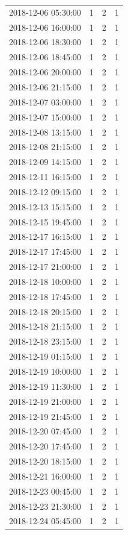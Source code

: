 \begin{tabular}{lrrr}
2018-12-06 05:30:00 & 1 & 2 & 1 \\
2018-12-06 16:00:00 & 1 & 2 & 1 \\
2018-12-06 18:30:00 & 1 & 2 & 1 \\
2018-12-06 18:45:00 & 1 & 2 & 1 \\
2018-12-06 20:00:00 & 1 & 2 & 1 \\
2018-12-06 21:15:00 & 1 & 2 & 1 \\
2018-12-07 03:00:00 & 1 & 2 & 1 \\
2018-12-07 15:00:00 & 1 & 2 & 1 \\
2018-12-08 13:15:00 & 1 & 2 & 1 \\
2018-12-08 21:15:00 & 1 & 2 & 1 \\
2018-12-09 14:15:00 & 1 & 2 & 1 \\
2018-12-11 16:15:00 & 1 & 2 & 1 \\
2018-12-12 09:15:00 & 1 & 2 & 1 \\
2018-12-13 15:15:00 & 1 & 2 & 1 \\
2018-12-15 19:45:00 & 1 & 2 & 1 \\
2018-12-17 16:15:00 & 1 & 2 & 1 \\
2018-12-17 17:45:00 & 1 & 2 & 1 \\
2018-12-17 21:00:00 & 1 & 2 & 1 \\
2018-12-18 10:00:00 & 1 & 2 & 1 \\
2018-12-18 17:45:00 & 1 & 2 & 1 \\
2018-12-18 20:15:00 & 1 & 2 & 1 \\
2018-12-18 21:15:00 & 1 & 2 & 1 \\
2018-12-18 23:15:00 & 1 & 2 & 1 \\
2018-12-19 01:15:00 & 1 & 2 & 1 \\
2018-12-19 10:00:00 & 1 & 2 & 1 \\
2018-12-19 11:30:00 & 1 & 2 & 1 \\
2018-12-19 21:00:00 & 1 & 2 & 1 \\
2018-12-19 21:45:00 & 1 & 2 & 1 \\
2018-12-20 07:45:00 & 1 & 2 & 1 \\
2018-12-20 17:45:00 & 1 & 2 & 1 \\
2018-12-20 18:15:00 & 1 & 2 & 1 \\
2018-12-21 16:00:00 & 1 & 2 & 1 \\
2018-12-23 00:45:00 & 1 & 2 & 1 \\
2018-12-23 21:30:00 & 1 & 2 & 1 \\
2018-12-24 05:45:00 & 1 & 2 & 1 \\

\end{tabular}
